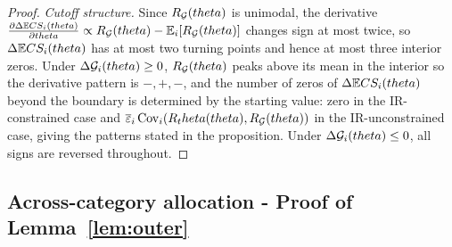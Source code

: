 \documentclass{class}
\begin{document}
\begin{proof}
\noindent\textit{Cutoff structure.} Since $R_{\mathcal{G}}(theta)$ is unimodal, the derivative $\frac{\partial \Delta\mathbb{E} CS_i(theta)}{\partial theta}\propto R_{\mathcal{G}}(theta)-\mathbb{E} _i[R_{\mathcal{G}}(theta)]$ changes sign at most twice, so $\Delta\mathbb{E} CS_i(theta)$ has at most two turning points and hence at most three interior zeros. Under $\Delta\mathcal{G}_i(theta)\ge 0$, $R_{\mathcal{G}}(theta)$ peaks above its mean in the interior so the derivative pattern is $-,+,-$, and the number of zeros of $\Delta \mathbb{E} CS_i(theta)$ beyond the boundary is determined by the starting value: zero in the IR-constrained case and $\overline\varepsilon_i\,\mathrm{Cov}_{i}(R_theta(theta),R_{\mathcal{G}}(theta))$ in the IR-unconstrained case, giving the patterns stated in the proposition. Under $\Delta\mathcal{G}_i(theta)\le 0$, all signs are reversed throughout.
\end{proof}
\subsection{Across-category allocation - Proof of Lemma~\ref{lem:outer}}\label{proof:outer}
\end{document}
